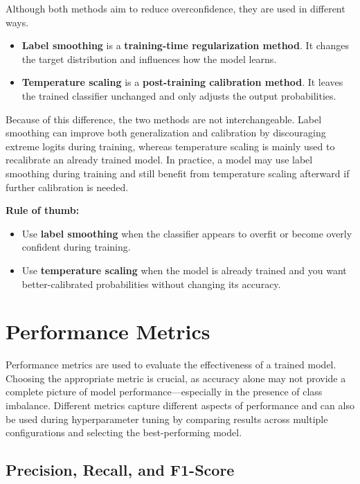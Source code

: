 \documentclass{article}
\begin{document}
Although both methods aim to reduce overconfidence, they are used in different ways.

\begin{itemize}
    \item \textbf{Label smoothing} is a \textbf{training-time regularization method}. It changes the target distribution and influences how the model learns.
    \item \textbf{Temperature scaling} is a \textbf{post-training calibration method}. It leaves the trained classifier unchanged and only adjusts the output probabilities.
\end{itemize}

Because of this difference, the two methods are not interchangeable. Label smoothing can improve both generalization and calibration by discouraging extreme logits during training, whereas temperature scaling is mainly used to recalibrate an already trained model. In practice, a model may use label smoothing during training and still benefit from temperature scaling afterward if further calibration is needed.

\medskip
\noindent\textbf{Rule of thumb:}
\begin{itemize}
    \item Use \textbf{label smoothing} when the classifier appears to overfit or become overly confident during training.
    \item Use \textbf{temperature scaling} when the model is already trained and you want better-calibrated probabilities without changing its accuracy.
\end{itemize}


\section{Performance Metrics}

Performance metrics are used to evaluate the effectiveness of a trained model. Choosing the appropriate metric is crucial, as accuracy alone may not provide a complete picture of model performance—especially in the presence of class imbalance. Different metrics capture different aspects of performance and can also be used during hyperparameter tuning by comparing results across multiple configurations and selecting the best-performing model.

\subsection{Precision, Recall, and F1-Score}
\end{document}
